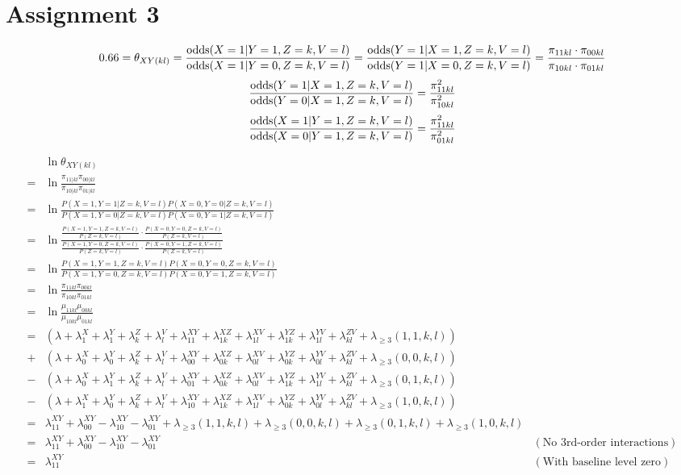 \documentclass{article}
\begin{document}
\section{Assignment 3}

\[0.66 = \theta_{XY(kl)} = \frac{\operatorname{odds}(X=1|Y=1,Z=k,V=l)}{\operatorname{odds}(X=1|Y=0,Z=k,V=l)} = \frac{\operatorname{odds}(Y=1|X=1,Z=k,V=l)}{\operatorname{odds}(Y=1|X=0,Z=k,V=l)} = \frac{\pi_{11kl}\cdot \pi_{00kl}}{\pi_{10kl}\cdot \pi_{01kl}} \]
\[\frac{\operatorname{odds}(Y=1|X=1,Z=k,V=l)}{\operatorname{odds}(Y=0|X=1,Z=k,V=l)} = \frac{\pi_{11kl}^2}{\pi_{10kl}^2} \]
\[\frac{\operatorname{odds}(X=1|Y=1,Z=k,V=l)}{\operatorname{odds}(X=0|Y=1,Z=k,V=l)} = \frac{\pi_{11kl}^2}{\pi_{01kl}^2} \]

\begin{align*}
    & \ln \theta_{XY(kl)} \\
    =& \ln \frac{\pi_{11|kl}\pi_{00|kl}}{\pi_{10|kl}\pi_{01|kl}} \\
    =& \ln \frac{P(X=1,Y=1|Z=k,V=l)P(X=0,Y=0|Z=k,V=l)}{P(X=1,Y=0|Z=k,V=l)P(X=0,Y=1|Z=k,V=l)} \\
    =& \ln \frac{\frac{P(X=1,Y=1,Z=k,V=l)}{P(Z=k,V=l)}\cdot\frac{P(X=0,Y=0,Z=k,V=l)}{P(Z=k,V=l)}}{\frac{P(X=1,Y=0,Z=k,V=l)}{P(Z=k,V=l)}\cdot \frac{P(X=0,Y=1,Z=k,V=l)}{P(Z=k,V=l)}} \\
    =& \ln \frac{P(X=1,Y=1,Z=k,V=l)P(X=0,Y=0,Z=k,V=l)}{P(X=1,Y=0,Z=k,V=l)P(X=0,Y=1,Z=k,V=l)} \\
    =& \ln \frac{\pi_{11kl}\pi_{00kl}}{\pi_{10kl}\pi_{01kl}} \\
    =& \ln \frac{\mu_{11kl}\mu_{00kl}}{\mu_{10kl}\mu_{01kl}} \\
    =& (\lambda+\lambda_1^X+\lambda_1^Y+\lambda_k^Z+\lambda_l^V+\lambda_{11}^{XY}+\lambda_{1k}^{XZ}+\lambda_{1l}^{XV}+\lambda_{1k}^{YZ}+\lambda_{1l}^{YV}+\lambda_{kl}^{ZV}+\lambda_{\geq3}(1,1,k,l))\\
    +& (\lambda+\lambda_0^X+\lambda_0^Y+\lambda_k^Z+\lambda_l^V+\lambda_{00}^{XY}+\lambda_{0k}^{XZ}+\lambda_{0l}^{XV}+\lambda_{0k}^{YZ}+\lambda_{0l}^{YV}+\lambda_{kl}^{ZV}+\lambda_{\geq3}(0,0,k,l))\\
    -& (\lambda+\lambda_0^X+\lambda_1^Y+\lambda_k^Z+\lambda_l^V+\lambda_{01}^{XY}+\lambda_{0k}^{XZ}+\lambda_{0l}^{XV}+\lambda_{1k}^{YZ}+\lambda_{1l}^{YV}+\lambda_{kl}^{ZV}+\lambda_{\geq3}(0,1,k,l))\\
    -& (\lambda+\lambda_1^X+\lambda_0^Y+\lambda_k^Z+\lambda_l^V+\lambda_{10}^{XY}+\lambda_{1k}^{XZ}+\lambda_{1l}^{XV}+\lambda_{0k}^{YZ}+\lambda_{0l}^{YV}+\lambda_{kl}^{ZV}+\lambda_{\geq3}(1,0,k,l))\\
    =& \lambda_{11}^{XY}+\lambda_{00}^{XY}-\lambda_{10}^{XY}-\lambda_{01}^{XY}+\lambda_{\geq3}(1,1,k,l)+\lambda_{\geq3}(0,0,k,l)+\lambda_{\geq3}(0,1,k,l)+\lambda_{\geq3}(1,0,k,l) \\
    =& \lambda_{11}^{XY}+\lambda_{00}^{XY}-\lambda_{10}^{XY}-\lambda_{01}^{XY} & (\text{No 3rd-order interactions}) \\
    =& \lambda_{11}^{XY} & (\text{With baseline level zero}) \\
\end{align*}
\end{document}
